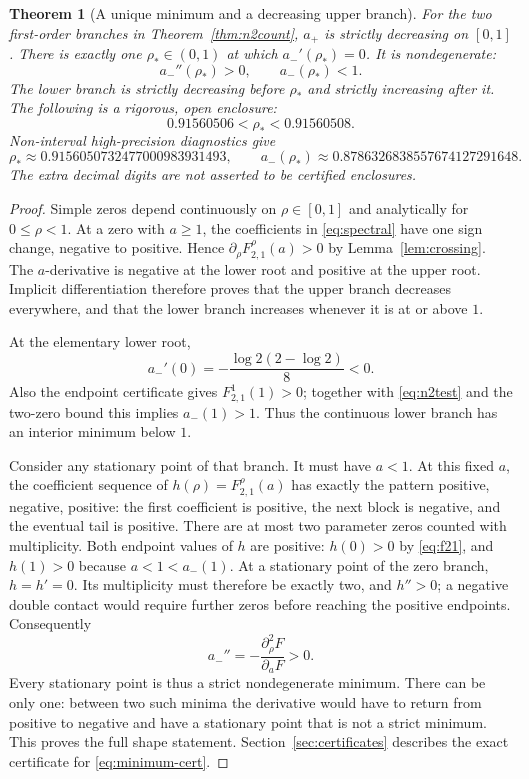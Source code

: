 \documentclass[11pt,letterpaper]{article}
\numberwithin{equation}{section}
\newtheorem{theorem}{Theorem}[section]
\theoremstyle{definition}\newtheorem{definition}[theorem]{Definition}
\theoremstyle{remark}\newtheorem{remark}[theorem]{Remark}
\newcommand{\F}[3]{F_{#1,#2}^{#3}}
\begin{document}
\begin{theorem}[A unique minimum and a decreasing upper branch]\label{thm:n2shape}
For the two first-order branches in Theorem~\ref{thm:n2count}, $a_+$ is strictly decreasing on $[0,1]$. There is exactly one $\rho_*\in(0,1)$ at which $a_-'(\rho_*)=0$. It is nondegenerate:
\[
 a_-''(\rho_*)>0,\qquad a_-(\rho_*)<1.
\]
The lower branch is strictly decreasing before $\rho_*$ and strictly increasing after it. The following is a rigorous, open enclosure:
\begin{equation}\label{eq:minimum-cert}
 0.91560506<\rho_*<0.91560508.
\end{equation}
Non-interval high-precision diagnostics give
\[
 \rho_*\approx0.9156050732477000983931493,
 \qquad a_-(\rho_*)\approx0.8786326838557674127291648.
\]
The extra decimal digits are not asserted to be certified enclosures.
\end{theorem}
\begin{proof}
Simple zeros depend continuously on $\rho\in[0,1]$ and analytically for $0\le\rho<1$. At a zero with $a\ge1$, the coefficients in \eqref{eq:spectral} have one sign change, negative to positive. Hence $\partial_\rho\F21\rho(a)>0$ by Lemma~\ref{lem:crossing}. The $a$-derivative is negative at the lower root and positive at the upper root. Implicit differentiation therefore proves that the upper branch decreases everywhere, and that the lower branch increases whenever it is at or above $1$.

At the elementary lower root,
\begin{equation}\label{eq:initial-slope}
 a_-'(0)=-\frac{\log2(2-\log2)}8<0.
\end{equation}
Also the endpoint certificate gives $\F21{1}(1)>0$; together with \eqref{eq:n2test} and the two-zero bound this implies $a_-(1)>1$. Thus the continuous lower branch has an interior minimum below $1$.

Consider any stationary point of that branch. It must have $a<1$. At this fixed $a$, the coefficient sequence of $h(\rho)=\F21\rho(a)$ has exactly the pattern positive, negative, positive: the first coefficient is positive, the next block is negative, and the eventual tail is positive. There are at most two parameter zeros counted with multiplicity. Both endpoint values of $h$ are positive: $h(0)>0$ by \eqref{eq:f21}, and $h(1)>0$ because $a<1<a_-(1)$. At a stationary point of the zero branch, $h=h'=0$. Its multiplicity must therefore be exactly two, and $h''>0$; a negative double contact would require further zeros before reaching the positive endpoints. Consequently
\[
 a_-''=-\frac{\partial_\rho^2F}{\partial_aF}>0.
\]
Every stationary point is thus a strict nondegenerate minimum. There can be only one: between two such minima the derivative would have to return from positive to negative and have a stationary point that is not a strict minimum. This proves the full shape statement. Section~\ref{sec:certificates} describes the exact certificate for \eqref{eq:minimum-cert}.
\end{proof}
\end{document}
